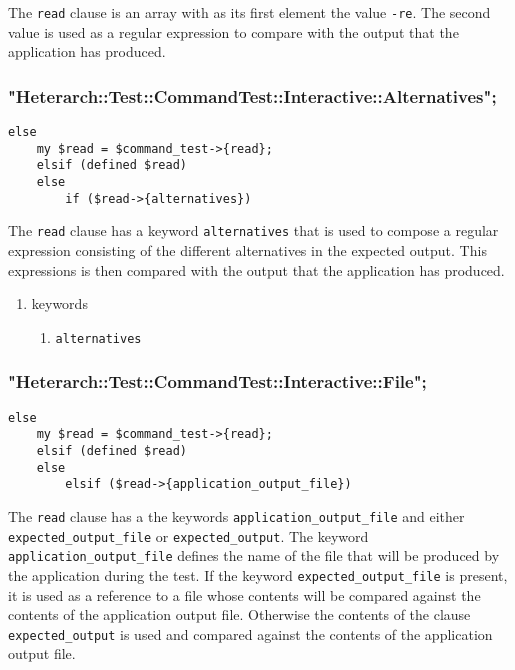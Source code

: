 \documentclass[11pt]{article}
\begin{document}
The \verb~read~ clause is an array with as its first element the value
\verb~-re~.  The second value is used as a regular expression to compare
with the output that the application has produced.


\subsubsection{"Heterarch::Test::CommandTest::Interactive::Alternatives";}
\label{sec-4-4-5}
\begin{verbatim}
else
    my $read = $command_test->{read};
    elsif (defined $read)
	else
	    if ($read->{alternatives})
\end{verbatim}

The \verb~read~ clause has a keyword \verb~alternatives~ that is used to
compose a regular expression consisting of the different alternatives
in the expected output.  This expressions is then compared with the
output that the application has produced.

\begin{enumerate}
\item keywords
\label{sec-4-4-5-1}
\begin{enumerate}
\item \texttt{alternatives}
\label{sec-4-4-5-1-1}
\end{enumerate}
\end{enumerate}

\subsubsection{"Heterarch::Test::CommandTest::Interactive::File";}
\label{sec-4-4-6}
\begin{verbatim}
else
    my $read = $command_test->{read};
    elsif (defined $read)
	else
	    elsif ($read->{application_output_file})
\end{verbatim}

The \verb~read~ clause has a the keywords \verb~application_output_file~ and
either \verb~expected_output_file~ or \verb~expected_output~.  The keyword
\verb~application_output_file~ defines the name of the file that will be
produced by the application during the test.  If the keyword
\verb~expected_output_file~ is present, it is used as a reference to a file
whose contents will be compared against the contents of the
application output file.  Otherwise the contents of the clause
\verb~expected_output~ is used and compared against the contents of the
application output file.
\end{document}
